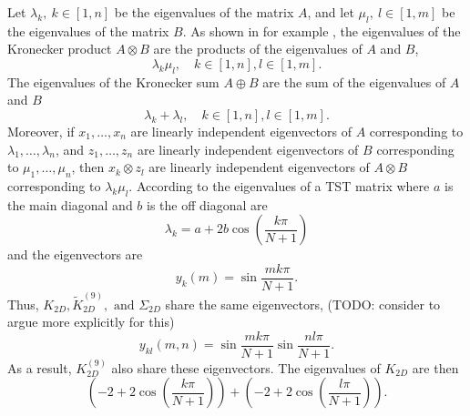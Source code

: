Let $\lambda_k, ~k\in[1, n]$ be the eigenvalues of the matrix $A$, and let $\mu_l, ~l\in [1, m]$ be the eigenvalues of the matrix $B$.
As shown in for example \textcite{Laub_2004}, the eigenvalues of the Kronecker product $A \otimes B$ are the products of the eigenvalues of $A$ and $B$,
$$
\lambda_k\mu_l, \quad k \in [1, n], l\in [1,m].
$$
The eigenvalues of the Kronecker sum $A\oplus B$ are the sum of the eigenvalues of $A$ and $B$
$$
\lambda_k + \lambda_l, \quad k \in [1, n], l\in [1,m].
$$
Moreover, if $x_1, \dots, x_n$ are linearly independent eigenvectors of $A$ corresponding to $\lambda_1, \dots, \lambda_n$, and $z_1, \dots, z_n$ are linearly independent eigenvectors of $B$ corresponding to $\mu_1, \dots, \mu_n$, then $x_k \otimes z_l$ are linearly independent eigenvectors of $A\otimes B$ corresponding to $\lambda_k \mu_l$.
According to \cite{tridiagonal} the eigenvalues of a TST matrix where $a$ is the main diagonal and $b$ is the off diagonal are 
\begin{equation*}
	\lambda_k = a + 2 b \cos\left(\frac{k \pi}{N + 1}\right)
\end{equation*}
and the eigenvectors are
\begin{equation*}
  y_k(m) = \sin\frac{m k \pi}{N+1}.
\end{equation*}
Thus, $K_{2D}, \tilde{K}_{2D}^{(9)}, \text{ and } \Sigma_{2D}$ share the same eigenvectors, (TODO: consider to argue more explicitly for this)
\begin{equation}\label{eq:pde:eigenvec}
y_{kl}(m, n) = \sin\frac{m k \pi}{N+1}\sin\frac{n l \pi}{N+1}.
\end{equation}
As a result, $K_{2D}^{(9)}$ also share these eigenvectors.
The eigenvalues of $K_{2D}$ are then
$$
\left(-2 + 2\cos\left(\frac{k \pi}{N + 1}\right)\right)
+
\left(-2 + 2\cos\left(\frac{l \pi}{N + 1}\right)\right).
$$
